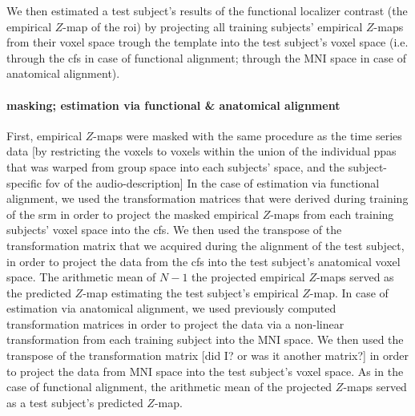 


%
We then estimated a test subject's results of the functional localizer contrast
(the empirical $Z$-map of the \ac{roi}) by projecting all training subjects'
empirical $Z$-maps from their voxel space trough the template into the test
subject's voxel space (i.e. through the \ac{cfs} in case of functional
alignment; through the MNI space in case of anatomical alignment).


\paragraph{masking; estimation via functional \& anatomical alignment}
%
First, empirical $Z$-maps were masked with the same procedure as the time series
data [by restricting the voxels to voxels within the union of the individual
\acp{ppa} \citep[s.][]{haeusler2022processing} that was warped from group space
into each subjects' space, and the subject-specific \ac{fov} of the
audio-description]
In the case of estimation via functional alignment, we used the transformation
matrices that were derived during training of the \ac{srm} in order to project
the masked empirical $Z$-maps from each training subjects' voxel space into the
\ac{cfs}.
We then used the transpose of the transformation matrix that we acquired during
the alignment of the test subject, in order to project the data from the
\ac{cfs} into the test subject's anatomical voxel space.
The arithmetic mean of $N-1$ the projected empirical $Z$-maps served as the
predicted $Z$-map estimating the test subject's empirical $Z$-map.
In case of estimation via anatomical alignment, we used previously computed
transformation matrices
\citep[][\href{https://github.com/psychoinformatics-de/studyforrest-data-templatetransforms
}{\url{github.com/psychoinformatics-de/studyforrest-data-templatetransforms}}]{hanke2014audiomovie}
in order to project the data via a non-linear transformation from each training
subject into the MNI space.
We then used the transpose of the transformation matrix [did I? or was it
another matrix?] in order to project the data from MNI space into the test
subject's voxel space.
%
As in the case of functional alignment, the arithmetic mean of the projected
$Z$-maps served as a test subject's predicted $Z$-map.

